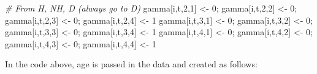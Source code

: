 \documentclass[
  12pt,
]{krantz}
\newenvironment{Shaded}{\begin{snugshade}}{\end{snugshade}}
\newcommand{\CommentTok}[1]{\textcolor[rgb]{0.56,0.35,0.01}{\textit{#1}}}
\newcommand{\DecValTok}[1]{\textcolor[rgb]{0.00,0.00,0.81}{#1}}
\newcommand{\NormalTok}[1]{#1}
\newcommand{\OtherTok}[1]{\textcolor[rgb]{0.56,0.35,0.01}{#1}}
\begin{document}
\begin{Shaded}
\begin{Highlighting}[]
      \CommentTok{\# From H, NH, D (always go to D)}
\NormalTok{      gamma[i,t,}\DecValTok{2}\NormalTok{,}\DecValTok{1}\NormalTok{] }\OtherTok{\textless{}{-}} \DecValTok{0}\NormalTok{; gamma[i,t,}\DecValTok{2}\NormalTok{,}\DecValTok{2}\NormalTok{] }\OtherTok{\textless{}{-}} \DecValTok{0}\NormalTok{; gamma[i,t,}\DecValTok{2}\NormalTok{,}\DecValTok{3}\NormalTok{] }\OtherTok{\textless{}{-}} \DecValTok{0}\NormalTok{; gamma[i,t,}\DecValTok{2}\NormalTok{,}\DecValTok{4}\NormalTok{] }\OtherTok{\textless{}{-}} \DecValTok{1}
\NormalTok{      gamma[i,t,}\DecValTok{3}\NormalTok{,}\DecValTok{1}\NormalTok{] }\OtherTok{\textless{}{-}} \DecValTok{0}\NormalTok{; gamma[i,t,}\DecValTok{3}\NormalTok{,}\DecValTok{2}\NormalTok{] }\OtherTok{\textless{}{-}} \DecValTok{0}\NormalTok{; gamma[i,t,}\DecValTok{3}\NormalTok{,}\DecValTok{3}\NormalTok{] }\OtherTok{\textless{}{-}} \DecValTok{0}\NormalTok{; gamma[i,t,}\DecValTok{3}\NormalTok{,}\DecValTok{4}\NormalTok{] }\OtherTok{\textless{}{-}} \DecValTok{1}
\NormalTok{      gamma[i,t,}\DecValTok{4}\NormalTok{,}\DecValTok{1}\NormalTok{] }\OtherTok{\textless{}{-}} \DecValTok{0}\NormalTok{; gamma[i,t,}\DecValTok{4}\NormalTok{,}\DecValTok{2}\NormalTok{] }\OtherTok{\textless{}{-}} \DecValTok{0}\NormalTok{; gamma[i,t,}\DecValTok{4}\NormalTok{,}\DecValTok{3}\NormalTok{] }\OtherTok{\textless{}{-}} \DecValTok{0}\NormalTok{; gamma[i,t,}\DecValTok{4}\NormalTok{,}\DecValTok{4}\NormalTok{] }\OtherTok{\textless{}{-}} \DecValTok{1}
\end{Highlighting}
\end{Shaded}

In the code above, age is passed in the data and created as follows:
\end{document}
